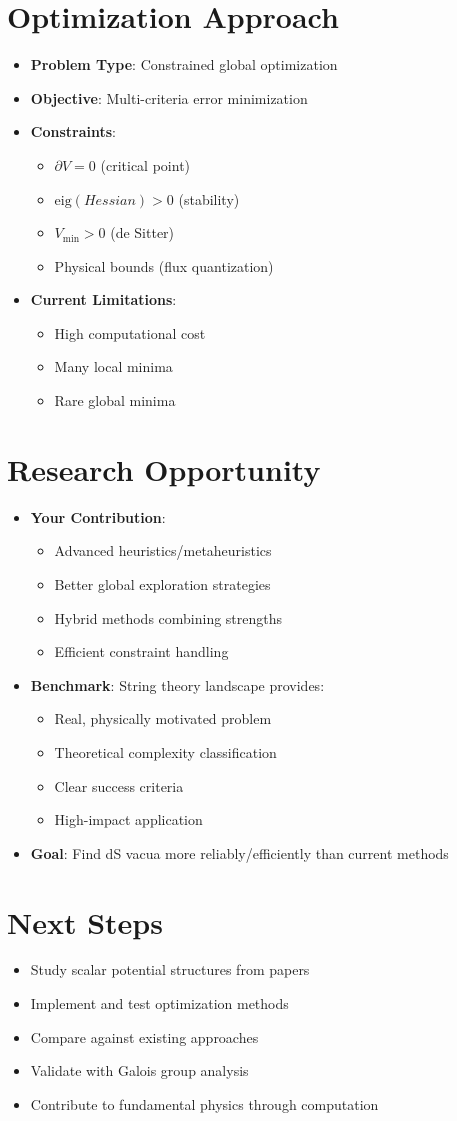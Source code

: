 \documentclass[12pt]{article}
\begin{document}
\section*{Optimization Approach}
\begin{itemize}
\item \textbf{Problem Type}: Constrained global optimization
\item \textbf{Objective}: Multi-criteria error minimization
\item \textbf{Constraints}:
  \begin{itemize}
  \item $\partial V = 0$ (critical point)
  \item $\text{eig}(Hessian) > 0$ (stability)
  \item $V_{\text{min}} > 0$ (de Sitter)
  \item Physical bounds (flux quantization)
  \end{itemize}
\item \textbf{Current Limitations}:
  \begin{itemize}
  \item High computational cost
  \item Many local minima
  \item Rare global minima
  \end{itemize}
\end{itemize}

\section*{Research Opportunity}
\begin{itemize}
\item \textbf{Your Contribution}:
  \begin{itemize}
  \item Advanced heuristics/metaheuristics
  \item Better global exploration strategies
  \item Hybrid methods combining strengths
  \item Efficient constraint handling
  \end{itemize}
\item \textbf{Benchmark}: String theory landscape provides:
  \begin{itemize}
  \item Real, physically motivated problem
  \item Theoretical complexity classification
  \item Clear success criteria
  \item High-impact application
  \end{itemize}
\item \textbf{Goal}: Find dS vacua more reliably/efficiently than current methods
\end{itemize}

\section*{Next Steps}
\begin{itemize}
\item Study scalar potential structures from papers
\item Implement and test optimization methods
\item Compare against existing approaches
\item Validate with Galois group analysis
\item Contribute to fundamental physics through computation
\end{itemize}
\end{document}
